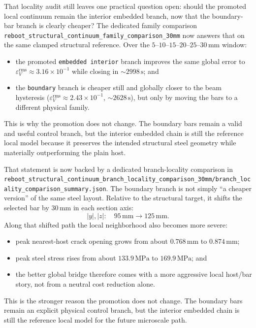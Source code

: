 That locality audit still leaves one practical question open: should the
promoted local continuum remain the interior embedded branch, now that the
boundary-bar branch is clearly cheaper?  The dedicated family comparison
\texttt{reboot\_structural\_continuum\_family\_comparison\_30mm} now answers
that on the same clamped structural reference.  Over the
\(5\)--\(10\)--\(15\)--\(20\)--\(25\)--\(30\,\mathrm{mm}\) window:
\begin{itemize}
  \item the promoted \texttt{embedded interior} branch improves the same
    global error to \(\varepsilon_V^{\mathrm{rms}} \approx 3.16\times10^{-1}\)
    while closing in \(\sim 2998\,\mathrm{s}\); and
  \item the \texttt{boundary} branch is cheaper still and globally closer to
    the beam hysteresis
    (\(\varepsilon_V^{\mathrm{rms}} \approx 2.43\times10^{-1}\),
    \(\sim 2628\,\mathrm{s}\)),
    but only by moving the bars to a different physical family.
\end{itemize}
This is why the promotion does not change.  The boundary bars remain a valid
and useful control branch, but the interior embedded chain is still the
reference local model because it preserves the intended structural steel
geometry while materially outperforming the plain host.

That statement is now backed by a dedicated branch-locality comparison in
\texttt{reboot\_structural\_continuum\_branch\_locality\_comparison\_30mm/branch\_locality\_comparison\_summary.json}.
The boundary branch is not simply ``a cheaper version'' of the same steel
layout.  Relative to the structural target, it shifts the selected bar by
\(30\,\mathrm{mm}\) in each section axis:
\[
|y|,|z|:\quad 95\,\mathrm{mm} \rightarrow 125\,\mathrm{mm}.
\]
Along that shifted path the local neighborhood also becomes more severe:
\begin{itemize}
  \item peak nearest-host crack opening grows from about
    \(0.768\,\mathrm{mm}\) to \(0.874\,\mathrm{mm}\);
  \item peak steel stress rises from about
    \(133.9\,\mathrm{MPa}\) to \(169.9\,\mathrm{MPa}\); and
  \item the better global bridge therefore comes with a more aggressive local
    host/bar story, not from a neutral cost reduction alone.
\end{itemize}
This is the stronger reason the promotion does not change. The boundary bars
remain an explicit physical control branch, but the interior embedded chain is
still the reference local model for the future microscale path.

